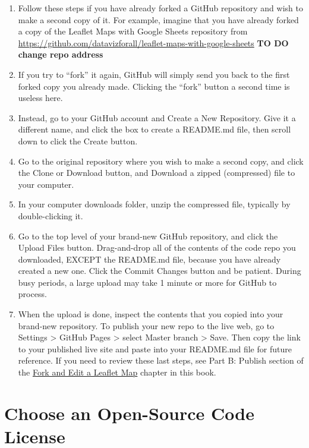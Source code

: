 \documentclass[
  english,
]{book}
\begin{document}
\begin{enumerate}
\def\labelenumi{\arabic{enumi})}
\item
  Follow these steps if you have already forked a GitHub repository and wish to make a second copy of it. For example, imagine that you have already forked a copy of the Leaflet Maps with Google Sheets repository from \url{https://github.com/datavizforall/leaflet-maps-with-google-sheets} \textbf{TO DO change repo address}
\item
  If you try to ``fork'' it again, GitHub will simply send you back to the first forked copy you already made. Clicking the ``fork'' button a second time is useless here.
\item
  Instead, go to your GitHub account and Create a New Repository. Give it a different name, and click the box to create a README.md file, then scroll down to click the Create button.
\item
  Go to the original repository where you wish to make a second copy, and click the Clone or Download button, and Download a zipped (compressed) file to your computer.
\item
  In your computer downloads folder, unzip the compressed file, typically by double-clicking it.
\item
  Go to the top level of your brand-new GitHub repository, and click the Upload Files button. Drag-and-drop all of the contents of the code repo you downloaded, EXCEPT the README.md file, because you have already created a new one. Click the Commit Changes button and be patient. During busy periods, a large upload may take 1 minute or more for GitHub to process.
\item
  When the upload is done, inspect the contents that you copied into your brand-new repository. To publish your new repo to the live web, go to Settings \textgreater{} GitHub Pages \textgreater{} select Master branch \textgreater{} Save. Then copy the link to your published live site and paste into your README.md file for future reference. If you need to review these last steps, see Part B: Publish section of the \href{fork-leaflet}{Fork and Edit a Leaflet Map} chapter in this book.
\end{enumerate}

\hypertarget{choose-license}{%
\section{Choose an Open-Source Code License}\label{choose-license}}
\end{document}
